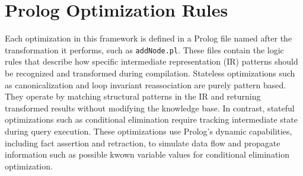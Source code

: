 \section{Prolog Optimization Rules}
\label{sec:rules}
Each optimization in this framework is defined in a Prolog file named after the transformation it performs, such as \texttt{addNode.pl}.
These files contain the logic rules that describe how specific intermediate representation (IR) patterns should be recognized and transformed during compilation.
Stateless optimizations such as canonicalization and loop invariant reassociation are purely pattern based.
They operate by matching structural patterns in the IR and returning transformed results without modifying the knowledge base.
In contrast, stateful optimizations such as conditional elimination require tracking intermediate state during query execution.
These optimizations use Prolog’s dynamic capabilities, including fact assertion and retraction, to simulate data flow and propagate information such as possible kwown variable values for conditional elimination optimization.




